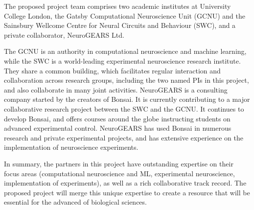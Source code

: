 The proposed project team comprises two academic
institutes at University College London, the Gatsby Computational Neuroscience Unit (GCNU) and the Sainsbury
Wellcome Centre for Neural Circuits and Behaviour (SWC), and a private
collaborator, NeuroGEARS Ltd.

The GCNU is an authority in computational neuroscience and
machine learning, while the SWC is a world-leading experimental
neuroscience research institute. They share a common building, which facilitates regular interaction and collaboration across research groups, including the two named PIs in this project, and also collaborate in many joint activities.
%
NeuroGEARS is a consulting company started by the creators of Bonsai. It is currently contributing to a major
collaborative research project between the SWC and the GCNU. It continues to develop Bonsai,
and offers courses around the globe instructing students on advanced experimental control.
NeuroGEARS has used Bonsai in numerous research and private experimental projects,
and has extensive experience on the implementation of neuroscience experiments.

In summary, the partners in this project have outstanding expertise on their focus areas (computational neuroscience and ML, experimental
neuroscience, implementation of experiments), as well as a rich collaborative
track record. The proposed project will merge this unique expertise to create a
resource that will be essential for the advanced of biological sciences.
